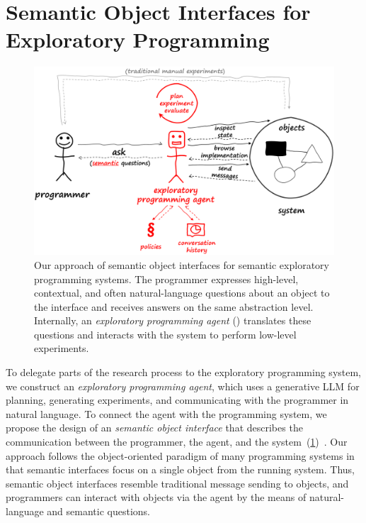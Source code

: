 
\section{Semantic Object Interfaces for Exploratory Programming}
\label{sec:design/agent}

\begin{figure}
	\centering
	\includegraphics[width=.9\textwidth]{03_agent/framework.png}
	\caption[Our approach of \emph{semantic object interfaces} for semantic exploratory programming systems.]{
		Our approach of semantic object interfaces for semantic exploratory programming systems.
		The programmer expresses high-level, contextual, and often natural-language questions about an object to the interface and receives answers on the same abstraction level.
		Internally, an \emph{exploratory programming agent} (\bold{\textcolor{red}{red}}) translates these questions and interacts with the system to perform low-level experiments.
	}
	\label{fig:design/agent/framework}
\end{figure}

To delegate parts of the research process to the exploratory programming system, we construct an \emph{exploratory programming agent}, which uses a generative LLM for planning, generating experiments, and communicating with the programmer in natural language.
To connect the agent with the programming system, we propose the design of an \emph{semantic object interface} that describes the communication between the programmer, the agent, and the system~(\cref{fig:design/agent/framework})~\cite{thiede2024talking}.
Our approach follows the object-oriented paradigm of many programming systems in that semantic interfaces focus on a single object from the running system.
Thus, semantic object interfaces resemble traditional message sending to objects, and programmers can interact with objects via the agent by the means of natural-language and semantic questions.

